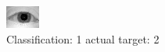\begin{figure}[h!]
\begin{center}
\includegraphics[width=0.60\columnwidth]{figures/ID985_class_1_target_2.png}
\end{center}
\caption{ Classification: 1 actual target: 2}
\label{fig:ID985_class_1_target_2}
\end{figure}

